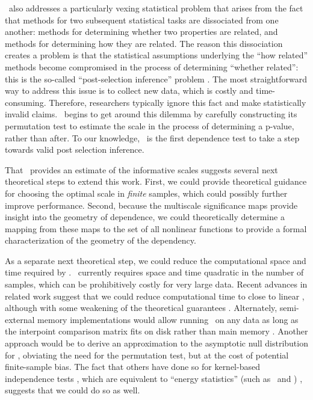 \documentclass[11pt]{article}
\begin{document}
\Mgc~also addresses a particularly vexing statistical problem that arises from the fact that methods for two subsequent statistical tasks are dissociated from one another: methods for determining whether two properties are related, and methods for determining how they are related.
The reason this dissociation creates a problem is that the statistical assumptions underlying the ``how related'' methods become compromised in the process of determining ``whether related'': this is the so-called ``post-selection inference'' problem \cite{berk2013valid}.
The most straightforward way to address this issue is to collect new data, which is costly and time-consuming. Therefore, researchers typically ignore this fact and make statistically invalid claims.
\Mgc~begins to get around this dilemma by carefully constructing its permutation test to estimate the scale in the process of determining a p-value, rather than after.
To our knowledge, \Mgc~is the first dependence test to take a step towards valid post selection inference.    

That \Mgc~provides an estimate of the informative scales suggests several next theoretical steps to extend this work. 
First, we could provide theoretical guidance for choosing the optimal scale in \emph{finite} samples, which could possibly further improve performance.  Second, because the multiscale significance maps provide insight into the geometry of dependence, we could theoretically determine a mapping from these maps to the set of all nonlinear functions to provide a formal characterization of the geometry of the dependency. 


As a separate next theoretical step, we could reduce the computational space and time required by \Mgc.  \Mgc~currently requires space and time quadratic in the number of samples, which can be prohibitively costly for very large data.  Recent advances in related work suggest that we could reduce computational time to close to linear  \cite{Huo2016}, although with some weakening of the theoretical guarantees \cite{zhang2017large}. Alternately, semi-external memory implementations would allow running \Mgc~on any data as long as the interpoint comparison matrix fits on disk rather than main memory \cite{Zheng2015,Zheng2016,Zheng2016c,Zheng2016b}. Another approach would be to derive an approximation to the asymptotic null distribution for \Mgc, obviating the need for the permutation test, but at the cost of potential finite-sample  bias.  The fact that others have done so for kernel-based independence tests   \cite{GrettonEtAl2005, GrettonGyorfi2010, GrettonEtAl2012}, which are equivalent to  ``energy statistics'' (such as \Dcorr~and \Mcorr) \cite{SejdinovicEtAl2013, RamdasEtAl2015}, suggests that we could do so as well.
\end{document}
